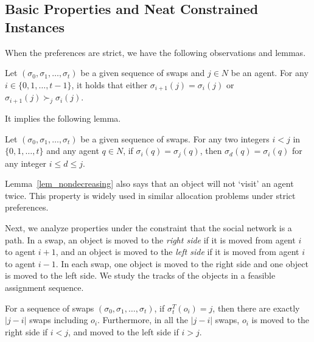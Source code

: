 \subsection{Basic Properties and Neat Constrained Instances}

When the preferences are strict, we have the following observations and lemmas.

\begin{ob}\label{obs_1}
    Let $(\sigma _0,\sigma _1,\dots,\sigma _t)$ be a given sequence of swaps and
    $j\in N$ be an agent. For any $i\in\{0,1,\dots,t-1\}$, it holds that either $\sigma_{i+1}(j) = \sigma_i(j)$ or
    $\sigma_{i+1}(j) \succ_j \sigma_i(j)$.
\end{ob}

It implies the following lemma.

\begin{lemma}\label{lem_nondecreasing}
    Let $(\sigma _0,\sigma _1,\dots,\sigma _t)$ be a given sequence of swaps.
    For any two integers $i<j$ in $\{0,1,\dots,t\}$ and any agent $q\in N$, if $\sigma _i(q)=\sigma _j(q)$,
    then $\sigma _d(q)=\sigma _i(q)$ for any integer $i\leq d \leq j$.
\end{lemma}

Lemma~\ref{lem_nondecreasing} also says that an object will not `visit' an agent twice. This property is widely used in similar allocation problems under strict preferences.

Next, we analyze properties under the constraint that the social network is a path.
In a swap, an object is moved to the \emph{right side} if it is moved from agent $i$ to agent $i+1$, and an object is moved to the \emph{left side} if it is moved from agent $i$ to agent $i-1$.
In each swap, one object is moved to the right side and one object is moved to the left side.
We study the tracks of the objects in a feasible assignment sequence.


\begin{lemma}\label{lem_exactly}
For a sequence of swaps $(\sigma _0,\sigma _1,\dots,\sigma _t)$, if  $\sigma^T _t(o_i)=j$,
then there are exactly $|j-i|$ swaps including $o_i$. Furthermore, in all the $|j-i|$ swaps, $o_i$ is moved
to the right side  if $i<j$, and  moved to the left side  if $i>j$.
\end{lemma}

